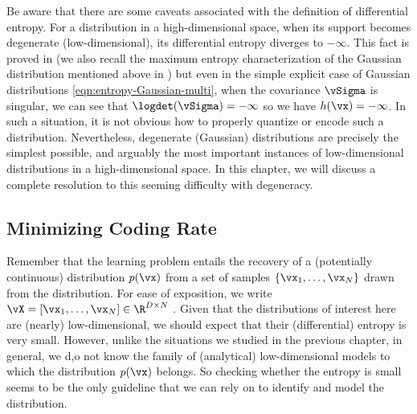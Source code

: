 \documentclass[../../book-main.tex]{subfiles}
\begin{document}
Be aware that there are some caveats associated with the definition of differential entropy. For a distribution in a high-dimensional space, when its support becomes degenerate (low-dimensional), its differential entropy diverges to \(-\infty\). This fact is proved in  (we also recall the maximum entropy characterization of the Gaussian distribution mentioned above in ) but even in the simple explicit case of Gaussian distributions \eqref{eqn:entropy-Gaussian-multi}, when the covariance \(\vSigma\) is singular, we can see that \(\logdet(\vSigma) = -\infty\) so we have \(h(\vx) = -\infty\). In such a situation, it is not obvious how to properly quantize or encode such a distribution. Nevertheless, degenerate (Gaussian) distributions are precisely the simplest possible, and arguably the most important instances of low-dimensional distributions in a high-dimensional space. In this chapter, we will discuss a complete resolution to this seeming difficulty with degeneracy.


\subsection{Minimizing Coding Rate}\label{sub:min_entropy}
Remember that the learning problem entails the recovery of a (potentially continuous)  distribution \(p(\vx)\) from a set of samples \(\{\vx_{1}, \ldots, \vx_{N}\}\) drawn from the distribution. For ease of exposition, we write \(\vX = [\vx_{1}, \ldots, \vx_{N}] \in \R^{D\times N}\) . Given that the distributions of interest here are (nearly) low-dimensional, we should expect that their (differential) entropy is very small. However, unlike the situations we studied in the previous chapter, in general, we d,o not know the family of (analytical) low-dimensional models to which the distribution \(p(\vx)\) belongs. So checking whether the entropy is small seems to be the only guideline that we can rely on to identify and model the distribution.
\end{document}
